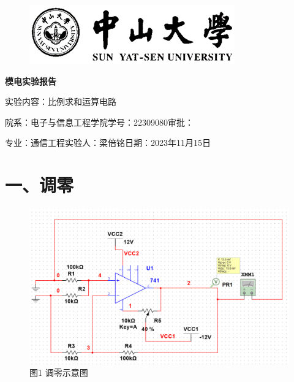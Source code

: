 \documentclass[a4paper,10pt,notitlepage]{article}
\begin{document}
	\large
	\onehalfspacing
	\begin{figure}[h]
		\raggedright
		\includegraphics{1.png}
	\end{figure}
	\centering
	{\Huge\textbf{模电实验报告}\par}
	\vspace{0.2cm}
	{\huge{实验内容：比例求和运算电路}\par}
	\raggedright
	\vspace{0.3cm}
	\begin{centering}
		{\large 院系：电子与信息工程学院\hfill 学号：22309080\hfill 审批：\hspace{2cm} \par
			专业：通信工程\hfill 实验人：梁倍铭\hfill 日期：2023年11月15日 \par}
	\end{centering}
	\vspace{0.3cm}
	\section*{一、调零}
	\begin{figure}[h]
		\centering
		\includegraphics[width=\textwidth]{2.png}
		\caption*{图1 调零示意图}
	\end{figure}
\end{document}
